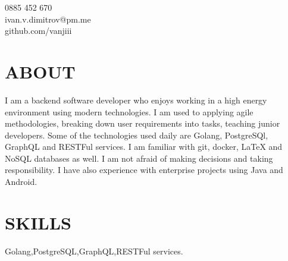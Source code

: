 \documentclass[margin,line]{resume}
\begin{document}
{
	\sc
    \hfill 0885 452 670		  \vspace{0mm}\\\vspace{0mm}%
    \hfill ivan.v.dimitrov@pm.me        \vspace{0mm}\\\vspace{0mm}%
    \hfill github.com/vanjiii		\vspace{0mm}\\\vspace{-10mm}%
}

\begin{resume}

\vspace{1mm}

    \section{\mysidestyle \textbf{\large{A}\small{BOUT}}}

    I am a backend software developer who enjoys working in a high energy environment using modern technologies. I am used to applying agile methodologies, breaking down user requirements into tasks, teaching junior developers. Some of the technologies used daily are Golang, PostgreSQl, GraphQL and RESTFul services. I am familiar with git, docker, LaTeX and NoSQL databases as well. I am not afraid of making decisions and taking responsibility. I have also experience with enterprise projects using Java and Android.

\sectionline

    \section{\mysidestyle \textbf{\large{S}\small{KILLS}}}

    Golang,\hspace{2mm}PostgreSQL,\hspace{2mm}GraphQL,\hspace{3mm}RESTFul services.

\sectionline


\end{resume}
\end{document}
